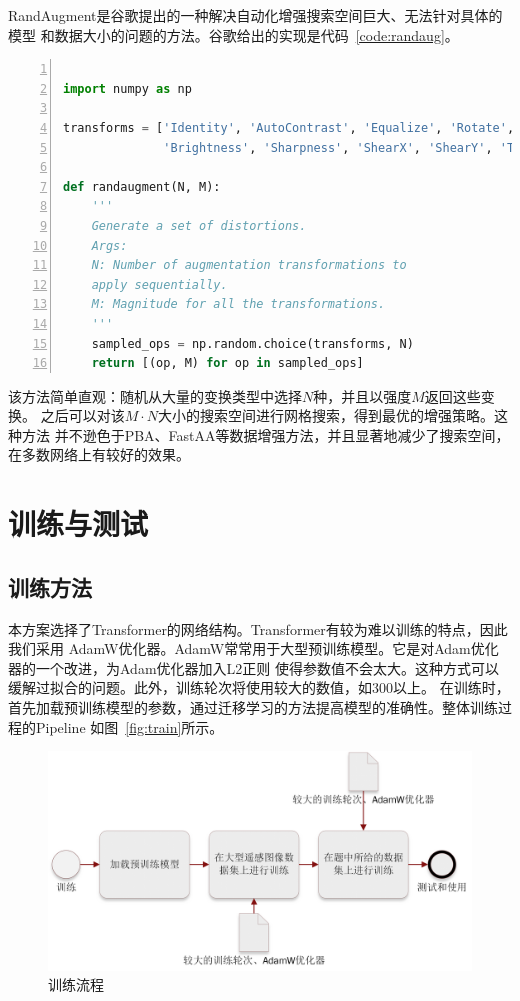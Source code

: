 \documentclass[a4paper,twoside,zihao=5,UTF8]{ctexrep}
\begin{document}
RandAugment\cite{randaug}是谷歌提出的一种解决自动化增强搜索空间巨大、无法针对具体的模型
和数据大小的问题的方法。谷歌给出的实现是代码~\ref{code:randaug}。

\begin{lstlisting}[language=Python,numbers=left,style=PythonStyle,label={code:randaug},caption=RandAugment]

import numpy as np

transforms = ['Identity', 'AutoContrast', 'Equalize', 'Rotate', 'Solarize', 'Color', 'Posterize', 'Contrast',
              'Brightness', 'Sharpness', 'ShearX', 'ShearY', 'TranslateX', 'TranslateY']

def randaugment(N, M):
    '''
    Generate a set of distortions.
    Args:
    N: Number of augmentation transformations to
    apply sequentially.
    M: Magnitude for all the transformations.
    '''
    sampled_ops = np.random.choice(transforms, N)
    return [(op, M) for op in sampled_ops]

\end{lstlisting}

该方法简单直观：随机从大量的变换类型中选择$N$种，并且以强度$M$返回这些变换。
之后可以对该$M\cdot N$大小的搜索空间进行网格搜索，得到最优的增强策略。这种方法
并不逊色于PBA、FastAA等数据增强方法，并且显著地减少了搜索空间\cite{ganaug}，
在多数网络上有较好的效果。

\chapter{训练与测试}

\section{训练方法}
本方案选择了Transformer的网络结构。Transformer有较为难以训练的特点，因此我们采用
AdamW优化器。AdamW常常用于大型预训练模型。它是对Adam优化器的一个改进，为Adam优化器加入L2正则
使得参数值不会太大。这种方式可以缓解过拟合的问题。此外，训练轮次将使用较大的数值，如300以上。
在训练时，首先加载预训练模型的参数，通过迁移学习的方法提高模型的准确性。整体训练过程的Pipeline
如图~\ref{fig:train}所示。

\begin{figure}[htbp]
    \includegraphics[width=\textwidth]{train.png}
    \centering
    \caption{训练流程}
    \label{fig:trainpipe}
\end{figure}
\end{document}
